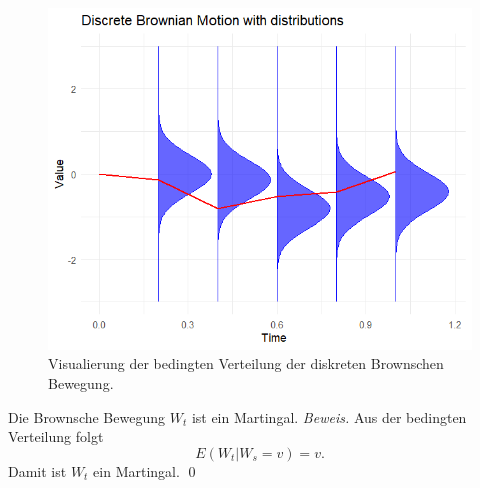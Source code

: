 \begin{bem}
\begin{figure}[H]
\begin{minipage}{0.48\textwidth}
    \includegraphics[width=\textwidth]{images/bb_with_cov.png}
    \caption{Visualierung der bedingten Verteilung der diskreten Brownschen Bewegung.}
    \label{fig:bb_with_cov}
  \end{minipage}
\end{figure}
\end{bem}

\begin{korr}
Die Brownsche Bewegung $W_t$ ist ein Martingal.
\textit{Beweis.} Aus der bedingten Verteilung folgt
$$
E(W_t | W_s = v) = v.
$$
Damit ist $W_t$ ein Martingal. \qed
\end{korr}  

